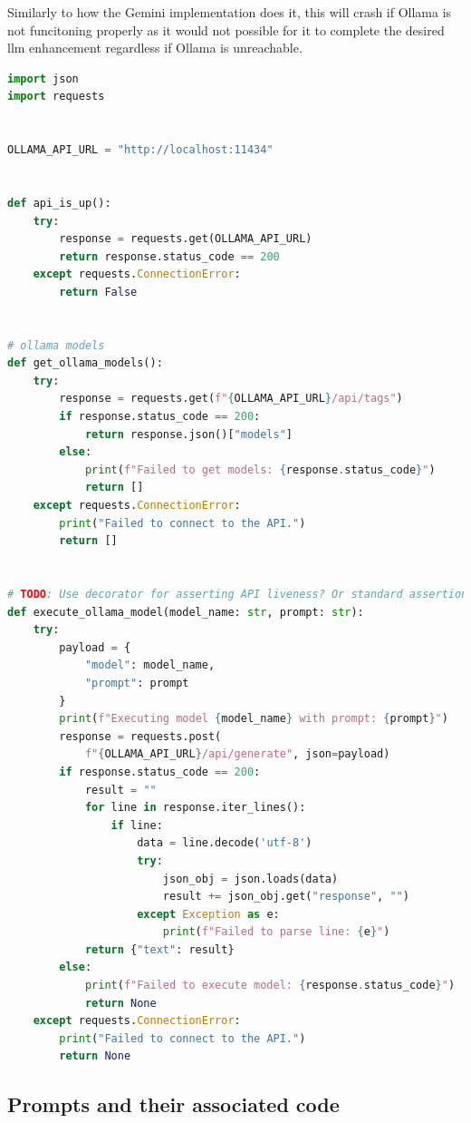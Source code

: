 Similarly to how the Gemini implementation does it, this will crash if Ollama is
not funcitoning properly as it would not possible for it to complete the desired
\acrshort{llm} enhancement regardless if Ollama is unreachable.

\begin{lstlisting}[caption={llm\_api\_interfaces/ollama.py, The implementation of an Ollama interface for executing prompts.}, label={lst:thorOllamaInterface}, language={Python}]
import json
import requests


OLLAMA_API_URL = "http://localhost:11434"


def api_is_up():
    try:
        response = requests.get(OLLAMA_API_URL)
        return response.status_code == 200
    except requests.ConnectionError:
        return False


# ollama models
def get_ollama_models():
    try:
        response = requests.get(f"{OLLAMA_API_URL}/api/tags")
        if response.status_code == 200:
            return response.json()["models"]
        else:
            print(f"Failed to get models: {response.status_code}")
            return []
    except requests.ConnectionError:
        print("Failed to connect to the API.")
        return []


# TODO: Use decorator for asserting API liveness? Or standard assertion??
def execute_ollama_model(model_name: str, prompt: str):
    try:
        payload = {
            "model": model_name,
            "prompt": prompt
        }
        print(f"Executing model {model_name} with prompt: {prompt}")
        response = requests.post(
            f"{OLLAMA_API_URL}/api/generate", json=payload)
        if response.status_code == 200:
            result = ""
            for line in response.iter_lines():
                if line:
                    data = line.decode('utf-8')
                    try:
                        json_obj = json.loads(data)
                        result += json_obj.get("response", "")
                    except Exception as e:
                        print(f"Failed to parse line: {e}")
            return {"text": result}
        else:
            print(f"Failed to execute model: {response.status_code}")
            return None
    except requests.ConnectionError:
        print("Failed to connect to the API.")
        return None
\end{lstlisting}

\subsection*{Prompts and their associated code}

